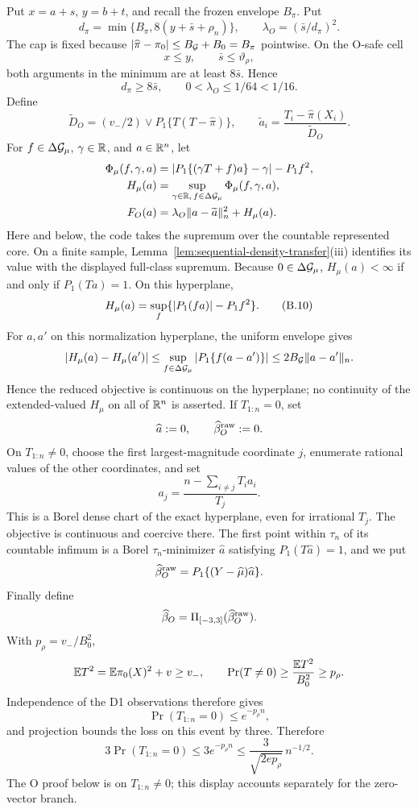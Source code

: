 Put \(x=a+s\), \(y=b+t\), and recall the frozen envelope \(B_\pi\).  Put
\[
 d_\pi=\min\{B_\pi,8(y+\bar s+\rho_n)\},\qquad
 \lambda_O=(\bar s/d_\pi)^2.
\]
The cap is fixed because
\(\lvert \widehat\pi-\pi_0\rvert\le B_{\mathcal G}+B_0=B_\pi\)
pointwise.
On the O-safe cell
\[
 x\le y,\qquad \bar s\le\vartheta_\rho,
\]
both arguments in the minimum are at least \(8\bar s\).  Hence
\[
 d_\pi\ge8\bar s,\qquad0<\lambda_O\le1/64<1/16.
\]
Define
\[
 \widetilde D_O=(v_-/2)\vee P_1\{T(T-\widehat\pi)\},\qquad
 \widetilde a_i=\frac{T_i-\widehat\pi(X_i)}{\widetilde D_O}.
\]
For \(f\in\Delta\mathcal G_\mu\), \(\gamma\in\mathbb R\), and \(a\in\mathbb R^n\), let
\begin{align*}
 \Phi_\mu(f,\gamma,a)
 &=\lvert P_1\{(\gamma T+f)a\}-\gamma\rvert-P_1f^2,\\
 H_\mu(a)&=\sup_{\gamma\in\mathbb R,\,f\in\Delta\mathcal G_\mu}
 \Phi_\mu(f,\gamma,a),\\
 F_O(a)&=\lambda_O\lVert a-\widetilde a\rVert_n^2+H_\mu(a).
\end{align*}
Here and below, the code takes the supremum over the countable represented
core.  On a finite sample, Lemma~\ref{lem:sequential-density-transfer}(iii)
identifies its value with the displayed full-class supremum.
Because \(0\in\Delta\mathcal G_\mu\), \(H_\mu(a)<\infty\) if and only if
\(P_1(Ta)=1\).  On this hyperplane,
\[
 H_\mu(a)=\sup_f\{\lvert P_1(fa)\rvert-P_1f^2\}.
 \tag{B.10}
\]
For \(a,a'\) on this normalization hyperplane, the uniform envelope gives
\[
 |H_\mu(a)-H_\mu(a')|
 \le\sup_{f\in\Delta\mathcal G_\mu}|P_1\{f(a-a')\}|
 \le2B_{\mathcal G}\lVert a-a'\rVert_n.
\]
Hence the reduced objective is continuous on the hyperplane; no continuity
of the extended-valued \(H_\mu\) on all of \(\mathbb R^n\) is asserted.
If \(T_{1:n}=0\), set
\[
 \widehat a:=0,\qquad
 \widehat\beta_O^{\rm raw}:=0.
\]
On \(T_{1:n}\ne0\), choose the first largest-magnitude coordinate \(j\),
enumerate rational values of the other coordinates, and set
\[
 a_j=\frac{n-\sum_{i\ne j}T_ia_i}{T_j}.
 \tag{B.11}
\]
This is a Borel dense chart of the exact hyperplane, even for irrational
\(T_j\).  The objective is continuous and coercive there.  The first point
within \(\tau_n\) of its countable infimum is a Borel
\(\tau_n\)-minimizer \(\widehat a\) satisfying \(P_1(T\widehat a)=1\), and
we put
\[
 \widehat\beta_O^{\rm raw}=P_1\{(Y-\widehat\mu)\widehat a\}.
\]
Finally define
\[
 \widehat\beta_O=\Pi_{[-3,3]}(\widehat\beta_O^{\rm raw}).
\]
With \(p_\rho=v_-/B_0^2\),
\[
 \mathbb E T^2=\mathbb E\pi_0(X)^2+v\ge v_-,\qquad
 \Pr(T\ne0)\ge\frac{\mathbb E T^2}{B_0^2}\ge p_\rho.
\]
Independence of the D1 observations therefore gives
\[
 \Pr(T_{1:n}=0)\le e^{-p_\rho n},
\]
and projection bounds the loss on this event by three.  Therefore
\[
 3\Pr(T_{1:n}=0)
 \le 3e^{-p_\rho n}
 \le \frac{3}{\sqrt{2ep_\rho}}\,n^{-1/2}.
\]
The O proof below is on \(T_{1:n}\ne0\); this display accounts separately
for the zero-vector branch.

